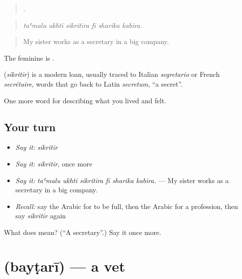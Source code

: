 \begin{quote}
     .
\end{quote}

\begin{quote}
\emph{taʿmalu ukhtī sikritīra fī sharika kabīra.}
\end{quote}

\begin{quote}
My sister works as a secretary in a big company.
\end{quote}

The feminine is .

\begin{cousinweb}
\textbf{} (\emph{sikritīr}) is a modern loan, usually traced to Italian \emph{segretario} or French \emph{secrétaire}, words that go back to Latin \emph{secretum}, \textquotedblleft{}a secret\textquotedblright{}.
\end{cousinweb}

\begin{grammarlens}[title={What you've built}]
One more word for describing what you lived and felt.
\end{grammarlens}

\subsection*{Your turn}
\begin{itemize}
\raggedright
  \item \emph{Say it:} \emph{sikritīr}
  \item \emph{Say it:} \emph{sikritīr}, once more
  \item \emph{Say it:} \emph{taʿmalu ukhtī sikritīra fī sharika kabīra.} — My sister works as a secretary in a big company.
  \item \emph{Recall:} say the Arabic for to be full, then the Arabic for a profession, then say \emph{sikritīr} again
\end{itemize}

\begin{tcolorbox}[breakable,colback=teal!4,colframe=teal!35!black,title={Before you move on}]
What does  mean? (\textquotedblleft{}A secretary\textquotedblright{}.) Say it once more.
\end{tcolorbox}
\section[\texorpdfstring{\ar{بيطري} (bayṭarī)}{بيطري (bayṭarī)}]{ (bayṭarī) — a vet}

